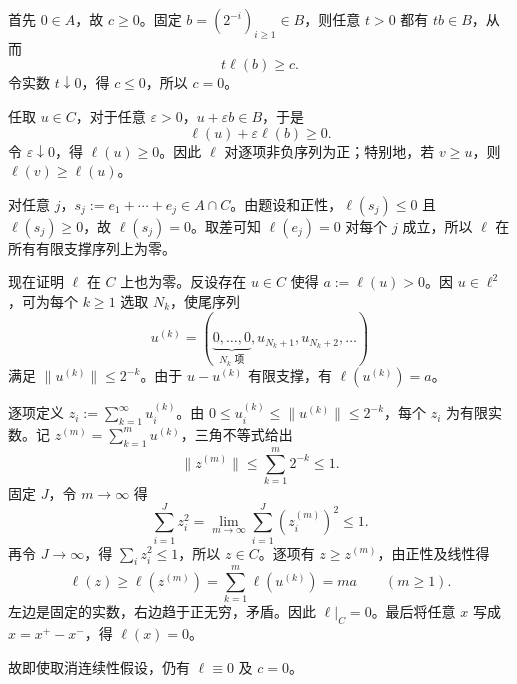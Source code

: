 \documentclass{article}
\begin{document}
首先 $0\in A$，故 $c\ge0$。固定 $b=(2^{-i})_{i\ge1}\in B$，则任意 $t>0$ 都有 $tb\in B$，从而
\[
t\ell(b)\ge c.
\]
令实数 $t\downarrow0$，得 $c\le0$，所以 $c=0$。

任取 $u\in C$，对于任意 $\varepsilon>0$，$u+\varepsilon b\in B$，于是
\[
\ell(u)+\varepsilon\ell(b)\ge0.
\]
令 $\varepsilon\downarrow0$，得 $\ell(u)\ge0$。因此 $\ell$ 对逐项非负序列为正；特别地，若 $v\ge u$，则 $\ell(v)\ge\ell(u)$。

对任意 $j$，$s_j:=e_1+\cdots+e_j\in A\cap C$。由题设和正性，$\ell(s_j)\le0$ 且 $\ell(s_j)\ge0$，故 $\ell(s_j)=0$。取差可知 $\ell(e_j)=0$ 对每个 $j$ 成立，所以 $\ell$ 在所有有限支撑序列上为零。

现在证明 $\ell$ 在 $C$ 上也为零。反设存在 $u\in C$ 使得 $a:=\ell(u)>0$。因 $u\in\ell^2$，可为每个 $k\ge1$ 选取 $N_k$，使尾序列
\[
u^{(k)}=(\underbrace{0,\ldots,0}_{N_k\text{ 项}},u_{N_k+1},u_{N_k+2},\ldots)
\]
满足 $\|u^{(k)}\|\le2^{-k}$。由于 $u-u^{(k)}$ 有限支撑，有 $\ell(u^{(k)})=a$。

逐项定义 $z_i:=\sum_{k=1}^{\infty}u_i^{(k)}$。由 $0\le u_i^{(k)}\le\|u^{(k)}\|\le2^{-k}$，每个 $z_i$ 为有限实数。记 $z^{(m)}=\sum_{k=1}^{m}u^{(k)}$，三角不等式给出
\[
\|z^{(m)}\|\le\sum_{k=1}^{m}2^{-k}\le1.
\]
固定 $J$，令 $m\to\infty$ 得
\[
\sum_{i=1}^{J}z_i^2
=\lim_{m\to\infty}\sum_{i=1}^{J}(z_i^{(m)})^2\le1.
\]
再令 $J\to\infty$，得 $\sum_i z_i^2\le1$，所以 $z\in C$。逐项有 $z\ge z^{(m)}$，由正性及线性得
\[
\ell(z)\ge\ell(z^{(m)})=\sum_{k=1}^{m}\ell(u^{(k)})=ma
\qquad(m\ge1).
\]
左边是固定的实数，右边趋于正无穷，矛盾。因此 $\ell|_C=0$。最后将任意 $x$ 写成 $x=x^+-x^-$，得 $\ell(x)=0$。

故即使取消连续性假设，仍有 $\ell\equiv0$ 及 $c=0$。
\end{document}
